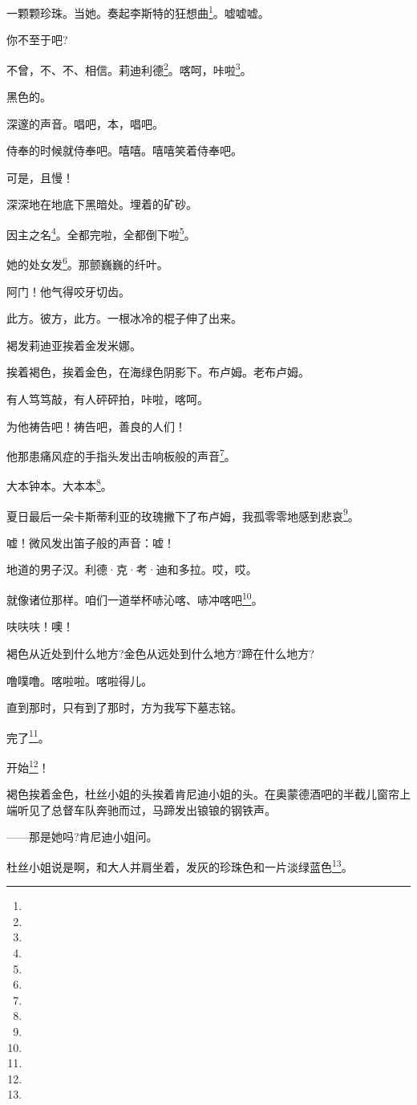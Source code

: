 \par 一颗颗珍珠。当她。奏起李斯特的狂想曲\footnote{}。嘘嘘嘘。
\par 你不至于吧?
\par 不曾，不、不、相信。莉迪利德\footnote{}。喀呵，咔啦\footnote{}。
\par 黑色的。
\par 深邃的声音。唱吧，本，唱吧。
\par 侍奉的时候就侍奉吧。嘻嘻。嘻嘻笑着侍奉吧。
\par 可是，且慢！
\par 深深地在地底下黑暗处。埋着的矿砂。
\par 因主之名\footnote{}。全都完啦，全都倒下啦\footnote{}。
\par 她的处女发\footnote{}。那颤巍巍的纤叶。
\par 阿门！他气得咬牙切齿。
\par 此方。彼方，此方。一根冰冷的棍子伸了出来。
\par 褐发莉迪亚挨着金发米娜。
\par 挨着褐色，挨着金色，在海绿色阴影下。布卢姆。老布卢姆。
\par 有人笃笃敲，有人砰砰拍，咔啦，喀呵。
\par 为他祷告吧！祷告吧，善良的人们！
\par 他那患痛风症的手指头发出击响板般的声音\footnote{}。
\par 大本钟本。大本本\footnote{}。
\par 夏日最后一朵卡斯蒂利亚的玫瑰撇下了布卢姆，我孤零零地感到悲哀\footnote{}。
\par 嘘！微风发出笛子般的声音：嘘！
\par 地道的男子汉。利德·克·考·迪和多拉。哎，哎。
\par 就像诸位那样。咱们一道举杯哧沁喀、哧冲喀吧\footnote{}。
\par 呋呋呋！噢！
\par 褐色从近处到什么地方?金色从远处到什么地方?蹄在什么地方?
\par 噜噗噜。喀啦啦。喀啦得儿。
\par 直到那时，只有到了那时，方为我写下墓志铭。
\par 完了\footnote{}。
\par 开始\footnote{}！
\par 褐色挨着金色，杜丝小姐的头挨着肯尼迪小姐的头。在奥蒙德酒吧的半截儿窗帘上端听见了总督车队奔驰而过，马蹄发出锒锒的钢铁声。
\par ——那是她吗?肯尼迪小姐问。
\par 杜丝小姐说是啊，和大人并肩坐着，发灰的珍珠色和一片淡绿蓝色\footnote{}。
